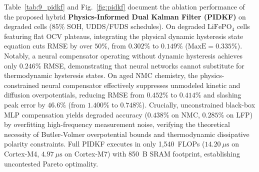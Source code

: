 \documentclass[balance,nocopyright,upint,varvw,hyphenate,barcolor=NavyBlue,nolists]{asmejour}
\begin{document}
\begin{table}[t]
\caption{Ablation study of PIDKF vs. baselines on degraded cells ($85\%$ SOH, UDDS/FUDS)\label{tab:9_pidkf}}
%
\end{table}

Table~\ref{tab:9_pidkf} and Fig.~\ref{fig:pidkf} document the ablation performance of the proposed hybrid \textbf{Physics-Informed Dual Kalman Filter (PIDKF)} on degraded cells ($85\%$ SOH, UDDS/FUDS schedules). On degraded $\text{LiFePO}_4$ cells featuring flat OCV plateaus, integrating the physical dynamic hysteresis state equation cuts RMSE by over $50\%$, from $0.302\%$ to $0.149\%$ ($\text{MaxE} = 0.335\%$). Notably, a neural compensator operating without dynamic hysteresis achieves only $0.246\%$ RMSE, demonstrating that neural networks cannot substitute for thermodynamic hysteresis states. On aged NMC chemistry, the physics-constrained neural compensator effectively suppresses unmodeled kinetic and diffusion overpotentials, reducing RMSE from $0.452\%$ to $0.414\%$ and slashing peak error by $46.6\%$ (from $1.400\%$ to $0.748\%$). Crucially, unconstrained black-box MLP compensation yields degraded accuracy ($0.438\%$ on NMC, $0.285\%$ on LFP) by overfitting high-frequency measurement noise, verifying the theoretical necessity of Butler-Volmer overpotential bounds and thermodynamic dissipative polarity constraints. Full PIDKF executes in only 1,540~FLOPs ($14.20~\mu\text{s}$ on Cortex-M4, $4.97~\mu\text{s}$ on Cortex-M7) with 850~B SRAM footprint, establishing uncontested Pareto optimality.
\end{document}
